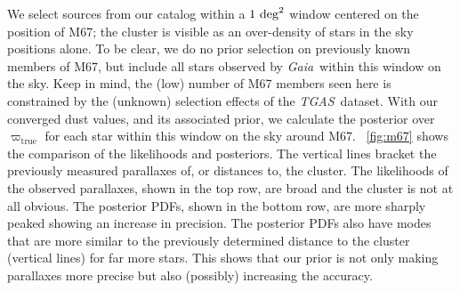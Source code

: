 \documentclass[modern]{aastex61}
\newcommand{\acronym}[1]{{\small{#1}}}
\newcommand{\project}[1]{\textsl{#1}}
\newcommand{\tgas}{\project{\acronym{TGAS}}}
\newcommand{\gaia}{\project{Gaia}}
\newcommand{\true}{\mathrm{true}}
\begin{document}
We select sources from our catalog within a $1~{\rm deg}^2$ window centered on the position of M67; the cluster is visible as an over-density of stars in the sky positions alone.
To be clear, we do no prior selection on previously known members of M67, but include all stars observed by \gaia\ within this window on the sky.
Keep in mind, the (low) number of M67 members seen here is constrained by the (unknown) selection effects of the \tgas\ dataset.
With our converged dust values, and its associated prior, we calculate the posterior over $\varpi_{\true}$ for each star within this window on the sky around M67.
\figurename~\ref{fig:m67} shows the comparison of the likelihoods and posteriors.
The vertical lines bracket the previously measured parallaxes of, or distances to, the cluster.
The likelihoods of the observed parallaxes, shown in the top row, are broad and the cluster is not at all obvious.
The posterior PDFs, shown in the bottom row, are more sharply peaked showing an increase in precision.
The posterior PDFs also have modes that are more similar to the previously determined distance to the cluster (vertical lines) for far more stars.
This shows that our prior is not only making parallaxes more precise but also (possibly) increasing the accuracy.
\end{document}
